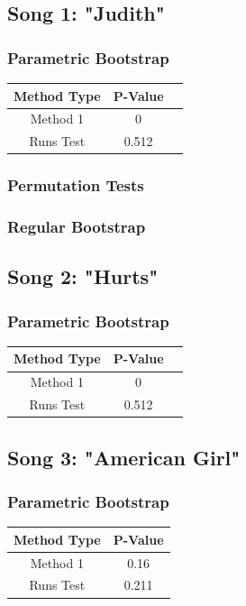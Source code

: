 \documentclass[12pt, letterpaper]{article}
\begin{document}
\subsection{Song 1: "Judith"}

\subsubsection{Parametric Bootstrap}
\begin{tabular}{|c|c|c|}
\hline
\textbf{Method Type} & P-Value \\
\hline
Method 1 & 0 \\
\hline
Runs Test & 0.512 \\ 
\hline
\end{tabular}


\subsubsection{Permutation Tests}
\subsubsection{Regular Bootstrap}

\subsection{Song 2: "Hurts"}

\subsubsection{Parametric Bootstrap}
\begin{tabular}{|c|c|c|}
\hline
\textbf{Method Type} & P-Value \\
\hline
Method 1 & 0  \\
\hline
Runs Test & 0.512 \\ 
\hline
\end{tabular}

\subsection{Song 3: "American Girl"}
\subsubsection{Parametric Bootstrap}

\begin{tabular}{|c|c|}
\hline
\textbf{Method Type} & P-Value \\
\hline
Method 1 & 0.16 \\
\hline
Runs Test & 0.211 \\ 
\hline 
\end{tabular}
\end{document}
